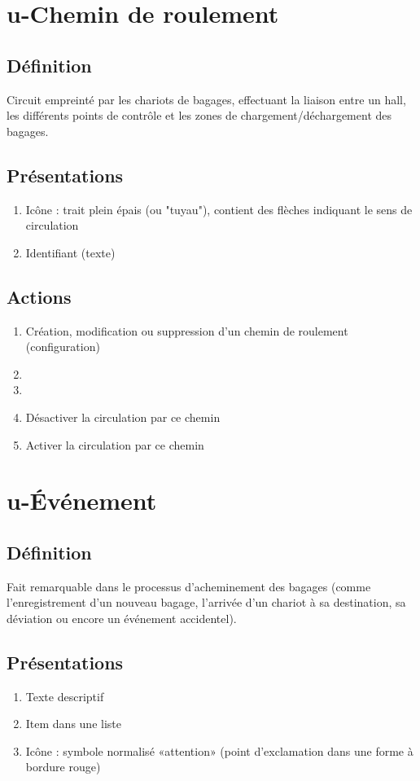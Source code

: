 \section{u-Chemin de roulement}
\subsection{Définition}
	Circuit empreinté par les chariots de bagages, effectuant la liaison entre un hall, les différents points de contrôle
	et les zones de chargement/déchargement des bagages.

\subsection{Présentations}
\begin{enumerate}
	\item Icône : trait plein épais (ou "tuyau"), contient des flèches indiquant le sens de circulation
	\item Identifiant (texte)
\end{enumerate}

\subsection{Actions}
\begin{enumerate}
	\item Création, modification ou suppression d'un chemin de roulement (configuration)
	\item \etat
	\item \transit
	\item Désactiver la circulation par ce chemin
	\item Activer la circulation par ce chemin
\end{enumerate}

\section{u-Événement}
\subsection{Définition}
	Fait remarquable dans le processus d'acheminement des bagages (comme l'enregistrement d'un nouveau bagage, l'arrivée
	d'un chariot à sa destination, sa déviation ou encore un événement accidentel).

\subsection{Présentations}
\begin{enumerate}
	\item Texte descriptif
	\item Item dans une liste
	\item Icône : symbole normalisé «attention» (point d'exclamation dans une forme à bordure rouge)
\end{enumerate}

